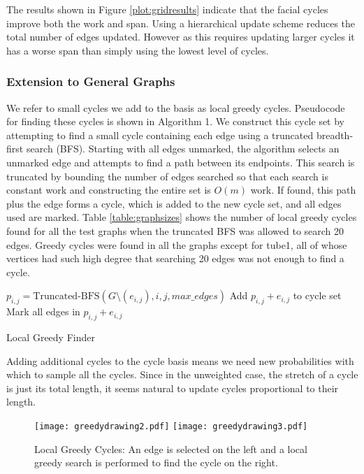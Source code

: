 \documentclass{sig-alternate}
\begin{document}
The results shown in Figure \ref{plot:gridresults}
indicate that the facial cycles
improve both the work and span. Using a hierarchical update scheme reduces
the total number of edges updated. However as this requires updating larger
cycles it has a worse span than simply using the lowest level of cycles.



\subsubsection{Extension to General Graphs}

We refer to small cycles we add
to the basis as local greedy cycles. Pseudocode for finding
these cycles is shown in Algorithm 1.
We construct this cycle set by attempting to find a small cycle containing
each edge
using a truncated breadth-first search (BFS).
Starting with all edges unmarked, the algorithm selects an unmarked edge and attempts
to find a path between its endpoints. This search is truncated by bounding the
number of edges searched so that each search
is constant work and constructing the entire set is $O(m)$ work.
If found, this path plus the edge forms a cycle, which
is added to the new cycle set, and all edges used are marked.
Table \ref{table:graphsizes} shows the number of local greedy cycles
found for all the test graphs when the truncated BFS was
allowed to search 20 edges.
Greedy cycles were found in all the graphs except for tube1,
all of whose vertices had such high degree that
searching 20 edges was not enough to find a cycle.

\begin{algorithm}[]
\begin{algorithmic}[]
\State $p_{i,j} = \textrm{Truncated-BFS}(G\setminus(e_{i,j}),i,j,max\_edges)$
\State Add $p_{i,j} + e_{i,j}$ to cycle set
\State Mark all edges in $p_{i,j}+e_{i,j}$
\EndIf
\EndFor
\EndFunction
\end{algorithmic}
\label{alg:LocalGreedy}
\caption{Local Greedy Finder}
\end{algorithm}


Adding additional cycles to the cycle basis means we need
new probabilities with which to sample all the cycles. Since in the unweighted
case, the stretch of a cycle is just its total length,
it seems natural to update cycles proportional
to their length.

\begin{figure}[h]
\centering
{}
\texttt{[image: greedydrawing2.pdf]}
\endminipage
{}
\texttt{[image: greedydrawing3.pdf]}
\endminipage
\caption{Local Greedy Cycles: An edge is selected on the left and a local
greedy search is performed to find the cycle on the right.}
\label{fig:localgreedy}
\end{figure}
\end{document}
